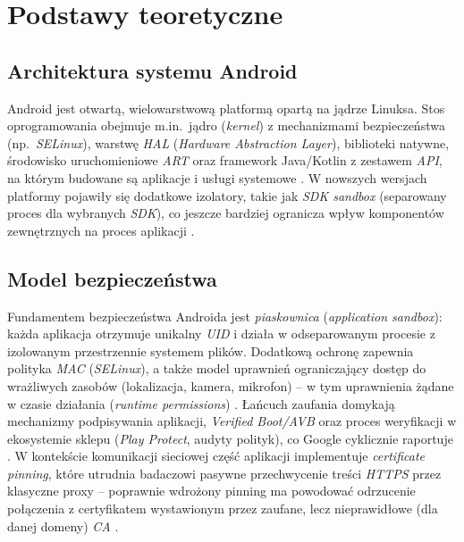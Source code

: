 \chapter{Podstawy teoretyczne}

\section{Architektura systemu Android}
Android jest otwartą, wielowarstwową platformą opartą na jądrze Linuksa. Stos oprogramowania obejmuje m.in.\ jądro (\emph{kernel}) z mechanizmami bezpieczeństwa (np.\ \emph{SELinux}), warstwę \emph{HAL} (\emph{Hardware Abstraction Layer}), biblioteki natywne, środowisko uruchomieniowe \emph{ART} oraz framework Java/Kotlin z zestawem \emph{API}, na którym budowane są aplikacje i usługi systemowe \cite{AOSPArchitecture,AndroidPlatformArchitecture}. W nowszych wersjach platformy pojawiły się dodatkowe izolatory, takie jak \emph{SDK sandbox} (separowany proces dla wybranych \emph{SDK}), co jeszcze bardziej ogranicza wpływ komponentów zewnętrznych na proces aplikacji \cite{SdkSandbox}.

\section{Model bezpieczeństwa}
Fundamentem bezpieczeństwa Androida jest \emph{piaskownica} (\emph{application sandbox}): każda aplikacja otrzymuje unikalny \emph{UID} i działa w odseparowanym procesie z izolowanym przestrzennie systemem plików. Dodatkową ochronę zapewnia polityka \emph{MAC} (\emph{SELinux}), a także model uprawnień ograniczający dostęp do wrażliwych zasobów (lokalizacja, kamera, mikrofon) – w tym uprawnienia żądane w czasie działania (\emph{runtime permissions}) \cite{AndroidSandbox,AndroidPermissionsOverview,AndroidPermissionRequest}. Łańcuch zaufania domykają mechanizmy podpisywania aplikacji, \emph{Verified Boot/AVB} oraz proces weryfikacji w ekosystemie sklepu (\emph{Play Protect}, audyty polityk), co Google cyklicznie raportuje \cite{GooglePlaySafety2024}. 
W kontekście komunikacji sieciowej część aplikacji implementuje \emph{certificate pinning}, które utrudnia badaczowi pasywne przechwycenie treści \emph{HTTPS} przez klasyczne proxy – poprawnie wdrożony pinning ma powodować odrzucenie połączenia z certyfikatem wystawionym przez zaufane, lecz nieprawidłowe (dla danej domeny) \emph{CA} \cite{OWASPMASTGPinning}.

